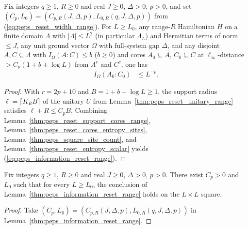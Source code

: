 \begin{lemma}
    \label{thm:peps_information_reset_range}
    \leanok
    Fix integers $q\ge1$, $R\ge0$ and real $J\ge0$, $\Delta>0$, $p>0$, and set $(C_p,L_0)=(C_{p,R}(J,\Delta,p),L_{0,R}(q,J,\Delta,p))$ from (\ref{eq:peps_reset_width_range}). For $L\ge L_0$, any range-$R$ Hamiltonian $H$ on a finite domain $\Lambda$ with $|\Lambda|\le L^2$ (in particular $\Lambda_L$) and Hermitian terms of norm $\le J$, any unit ground vector $\Omega$ with full-system gap $\Delta$, and any disjoint $A,C\subseteq\Lambda$ with $I_\Omega(A:C)\le b$ ($b\ge0$) and cores $A_0\subseteq A$, $C_0\subseteq C$ at $\ell_\infty$-distance $>C_p(1+b+\log L)$ from $A^c$ and $C^c$, one has
    \begin{align}
        I_\Omega(A_0:C_0) & \le L^{-p}.
        \label{eq:peps_information_reset_range}
    \end{align}
\end{lemma}
\begin{proof}
    \leanok
    With $r=2p+10$ and $B=1+b+\log L\ge1$, the support radius $\ell=\lceil K_RB\rceil$ of the unitary $U$ from Lemma~\ref{thm:peps_reset_unitary_range} satisfies $\ell+R\le C_pB$. Combining Lemma~\ref{thm:peps_reset_support_cores_range}, Lemma~\ref{thm:peps_reset_cores_entropy_sites}, Lemma~\ref{thm:peps_square_site_count}, and Lemma~\ref{thm:peps_reset_entropy_scalar} yields (\ref{eq:peps_information_reset_range}).
\end{proof}

\begin{lemma}
    \label{thm:peps_information_reset_range_exists}
    \leanok
    Fix integers $q\ge1$, $R\ge0$ and real $J\ge0$, $\Delta>0$, $p>0$. There exist $C_p>0$ and $L_0$ such that for every $L\ge L_0$, the conclusion of Lemma~\ref{thm:peps_information_reset_range} holds on the $L\times L$ square.
\end{lemma}
\begin{proof}
    \leanok
    Take $(C_p,L_0)=(C_{p,R}(J,\Delta,p),L_{0,R}(q,J,\Delta,p))$ in Lemma~\ref{thm:peps_information_reset_range}.
\end{proof}

